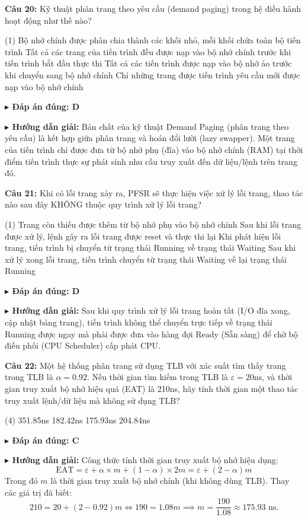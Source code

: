 \documentclass[11pt,a4paper]{article}
\newcommand{\giaithich}[2]{%
    \par\vspace{0.15cm}\noindent
    \begingroup\small
    \noindent\textbf{\color{blue}$\blacktriangleright$ Đáp án đúng: #1} \par\vspace{0.08cm}
    \noindent\textbf{\color{teal}$\blacktriangleright$ Hướng dẫn giải:} #2
    \endgroup\par\vspace{0.35cm}
}
\begin{document}
\noindent\textbf{Câu 20:} Kỹ thuật phân trang theo yêu cầu (demand paging) trong hệ điều hành hoạt động như thế nào?
\begin{tasks}(1)
    \task Bộ nhớ chính được phân chia thành các khối nhỏ, mỗi khối chứa toàn bộ tiến trình
    \task Tất cả các trang của tiến trình đều được nạp vào bộ nhớ chính trước khi tiến trình bắt đầu thực thi
    \task Tất cả các tiến trình được nạp vào bộ nhớ ảo trước khi chuyển sang bộ nhớ chính
    \task Chỉ những trang được tiến trình yêu cầu mới được nạp vào bộ nhớ chính
\end{tasks}
\giaithich{D}{Bản chất của kỹ thuật Demand Paging (phân trang theo yêu cầu) là kết hợp giữa phân trang và hoán đổi lười (lazy swapper). Một trang của tiến trình chỉ được đưa từ bộ nhớ phụ (đĩa) vào bộ nhớ chính (RAM) tại thời điểm tiến trình thực sự phát sinh nhu cầu truy xuất đến dữ liệu/lệnh trên trang đó.}

\noindent\textbf{Câu 21:} Khi có lỗi trang xảy ra, PFSR sẽ thực hiện việc xử lý lỗi trang, thao tác nào sau đây KHÔNG thuộc quy trình xử lý lỗi trang?
\begin{tasks}(1)
    \task Trang còn thiếu được thêm từ bộ nhớ phụ vào bộ nhớ chính
    \task Sau khi lỗi trang được xử lý, lệnh gây ra lỗi trang được reset và thực thi lại
    \task Khi phát hiện lỗi trang, tiến trình bị chuyển từ trạng thái Running về trạng thái Waiting
    \task Sau khi xử lý xong lỗi trang, tiến trình chuyển từ trạng thái Waiting về lại trạng thái Running
\end{tasks}
\giaithich{D}{Sau khi quy trình xử lý lỗi trang hoàn tất (I/O đĩa xong, cập nhật bảng trang), tiến trình không thể chuyển trực tiếp về trạng thái Running được ngay mà phải được đưa vào hàng đợi Ready (Sẵn sàng) để chờ bộ điều phối (CPU Scheduler) cấp phát CPU.}

\noindent\textbf{Câu 22:} Một hệ thống phân trang sử dụng TLB với xác suất tìm thấy trang trong TLB là $\alpha = 0.92$. Nếu thời gian tìm kiếm trong TLB là $\varepsilon = 20\text{ns}$, và thời gian truy xuất bộ nhớ hiệu quả (EAT) là 210ns, hãy tính thời gian một thao tác truy xuất lệnh/dữ liệu mà không sử dụng TLB?
\begin{tasks}(4)
    \task 351.85ns
    \task 182.42ns
    \task 175.93ns
    \task 204.84ns
\end{tasks}
\giaithich{C}{Công thức tính thời gian truy xuất bộ nhớ hiệu dụng:
$$\text{EAT} = \varepsilon + \alpha \times m + (1 - \alpha) \times 2m = \varepsilon + (2 - \alpha)m$$
Trong đó $m$ là thời gian truy xuất bộ nhớ chính (khi không dùng TLB).
Thay các giá trị đã biết:
$$210 = 20 + (2 - 0.92)m \iff 190 = 1.08m \implies m = \frac{190}{1.08} \approx 175.93\text{ ns.}$$}
\end{document}
